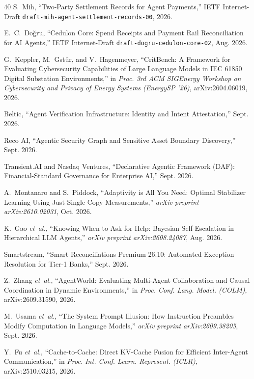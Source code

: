 \documentclass[10pt,journal,compsoc]{IEEEtran}
\begin{document}
\begin{thebibliography}{40}
S.~Mih, ``Two-Party Settlement Records for Agent Payments,'' IETF Internet-Draft \texttt{draft-mih-agent-settlement-records-00}, 2026.

E.~C.~Do\u{g}ru, ``Cedulon Core: Spend Receipts and Payment Rail Reconciliation for AI Agents,'' IETF Internet-Draft \texttt{draft-dogru-cedulon-core-02}, Aug. 2026.

G.~Keppler, M.~Gst\u{u}r, and V.~Hagenmeyer, ``CritBench: A Framework for Evaluating Cybersecurity Capabilities of Large Language Models in IEC 61850 Digital Substation Environments,'' in \emph{Proc. 3rd ACM SIGEnergy Workshop on Cybersecurity and Privacy of Energy Systems (EnergySP '26)}, arXiv:2604.06019, 2026.

Beltic, ``Agent Verification Infrastructure: Identity and Intent Attestation,'' Sept. 2026.

Reco AI, ``Agentic Security Graph and Sensitive Asset Boundary Discovery,'' Sept. 2026.

Transient.AI and Nasdaq Ventures, ``Declarative Agentic Framework (DAF): Financial-Standard Governance for Enterprise AI,'' Sept. 2026.

A.~Montanaro and S.~Piddock, ``Adaptivity is All You Need: Optimal Stabilizer Learning Using Just Single-Copy Measurements,'' \emph{arXiv preprint arXiv:2610.02031}, Oct. 2026.

K.~Gao \emph{et~al.}, ``Knowing When to Ask for Help: Bayesian Self-Escalation in Hierarchical LLM Agents,'' \emph{arXiv preprint arXiv:2608.24087}, Aug. 2026.

Smartstream, ``Smart Reconciliations Premium 26.10: Automated Exception Resolution for Tier-1 Banks,'' Sept. 2026.

Z.~Zhang \emph{et~al.}, ``AgentWorld: Evaluating Multi-Agent Collaboration and Causal Coordination in Dynamic Environments,'' in \emph{Proc. Conf. Lang. Model. (COLM)}, arXiv:2609.31590, 2026.

M.~Usama \emph{et~al.}, ``The System Prompt Illusion: How Instruction Preambles Modify Computation in Language Models,'' \emph{arXiv preprint arXiv:2609.38205}, Sept. 2026.

Y.~Fu \emph{et~al.}, ``Cache-to-Cache: Direct KV-Cache Fusion for Efficient Inter-Agent Communication,'' in \emph{Proc. Int. Conf. Learn. Represent. (ICLR)}, arXiv:2510.03215, 2026.


\end{thebibliography}
\end{document}
